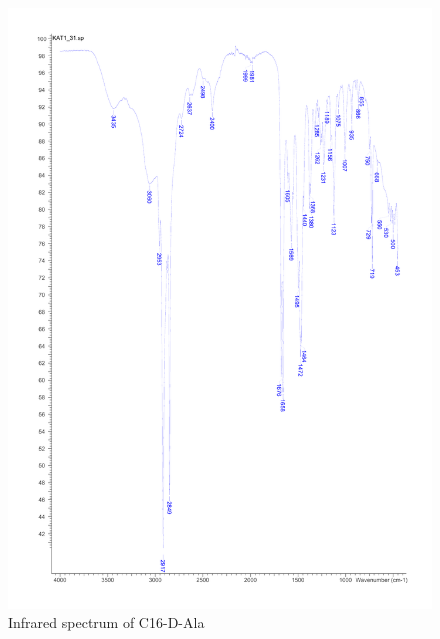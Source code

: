 \begin{figure}[ht!]
\centering
\includegraphics[scale=0.6]{IR/KAT1_31.pdf}
\caption{Infrared spectrum of C16-D-Ala}
\end{figure}

